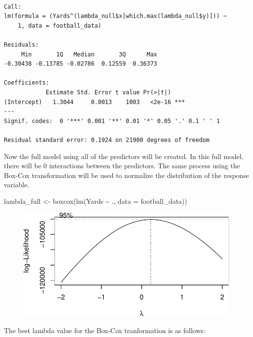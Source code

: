 \documentclass[
  super,
  preprint,
  3p]{elsarticle}
\newenvironment{Shaded}{\begin{snugshade}}{\end{snugshade}}
\newcommand{\AttributeTok}[1]{\textcolor[rgb]{0.40,0.45,0.13}{#1}}
\newcommand{\FunctionTok}[1]{\textcolor[rgb]{0.28,0.35,0.67}{#1}}
\newcommand{\NormalTok}[1]{\textcolor[rgb]{0.00,0.23,0.31}{#1}}
\newcommand{\OtherTok}[1]{\textcolor[rgb]{0.00,0.23,0.31}{#1}}
\newcommand{\SpecialCharTok}[1]{\textcolor[rgb]{0.37,0.37,0.37}{#1}}
\begin{document}
\begin{verbatim}

Call:
lm(formula = (Yards^(lambda_null$x[which.max(lambda_null$y)])) ~ 
    1, data = football_data)

Residuals:
     Min       1Q   Median       3Q      Max 
-0.30438 -0.13785 -0.02786  0.12559  0.36373 

Coefficients:
            Estimate Std. Error t value Pr(>|t|)    
(Intercept)   1.3044     0.0013    1003   <2e-16 ***
---
Signif. codes:  0 '***' 0.001 '**' 0.01 '*' 0.05 '.' 0.1 ' ' 1

Residual standard error: 0.1924 on 21900 degrees of freedom
\end{verbatim}

Now the full model using all of the predictors will be created. In this
full model, there will be 0 interactions between the predictors. The
same process using the Box-Cox transformation will be used to normalize
the distribution of the response variable.

\begin{Shaded}
\begin{Highlighting}[]
\NormalTok{lambda\_full }\OtherTok{\textless{}{-}} \FunctionTok{boxcox}\NormalTok{(}\FunctionTok{lm}\NormalTok{(Yards }\SpecialCharTok{\textasciitilde{}}\NormalTok{ ., }\AttributeTok{data =}\NormalTok{ football\_data))}
\end{Highlighting}
\end{Shaded}

\begin{figure}[H]

{\centering \includegraphics{project_report_files/figure-pdf/unnamed-chunk-25-1.pdf}

}

\end{figure}

The best lambda value for the Box-Cox tranformation is as follows:
\end{document}
